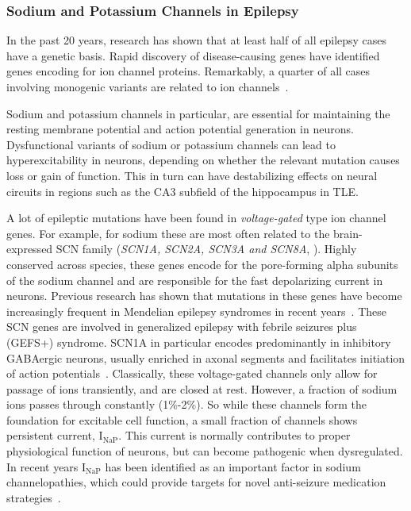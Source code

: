 \subsubsection{Sodium and Potassium Channels in Epilepsy}
In the past 20 years, research has shown that at least half of all epilepsy cases have a genetic basis.
Rapid discovery of disease-causing genes have identified genes encoding for ion channel proteins.
Remarkably, a quarter of all cases involving monogenic variants are related to ion channels~\parencite{strianoGeneticTestingPrecision2020,oyrerIonChannelsGenetic2018}.

Sodium and potassium channels in particular, are essential for maintaining the resting
membrane potential and action potential generation in neurons.
Dysfunctional variants of sodium or potassium channels can lead to hyperexcitability in neurons, depending on whether the relevant mutation causes loss or gain of function.
This in turn can have destabilizing effects on neural circuits in regions such as the CA3 subfield of the hippocampus in TLE\@.

A lot of epileptic mutations have been found in \textit{voltage-gated} type ion channel genes.
For example, for sodium these are most often related to the brain-expressed SCN family (\textit{SCN1A, SCN2A, SCN3A and SCN8A}, \textcite{brunklausSodiumChannelEpilepsies2020}).
Highly conserved across species, these genes encode for the pore-forming alpha subunits of the sodium channel and are responsible for the fast depolarizing current in neurons.
Previous research has shown that mutations in these genes have become increasingly frequent in Mendelian epilepsy syndromes in recent years~\parencite{brunklausSodiumChannelEpilepsies2020}.
These SCN genes are involved in generalized epilepsy with febrile seizures plus (GEFS+) syndrome.
SCN1A in particular encodes predominantly in inhibitory GABAergic neurons, usually enriched in axonal segments and facilitates initiation of action potentials~\parencite{yuReducedSodiumCurrent2006}.
Classically, these voltage-gated channels only allow for passage of ions transiently, and are closed at rest.
However, a fraction of sodium ions passes through constantly (1\%-2\%).
So while these channels form the foundation for excitable cell function, a small fraction of channels shows persistent current, \(\text{I}_{\text{NaP}}\).
This current is normally contributes to proper physiological function of neurons, but can become pathogenic when dysregulated.
In recent years \(\text{I}_{\text{NaP}}\) has been identified as an important factor in sodium channelopathies, which could provide targets for novel anti-seizure medication strategies~\parencite{wengertRolePersistentSodium2021}.

